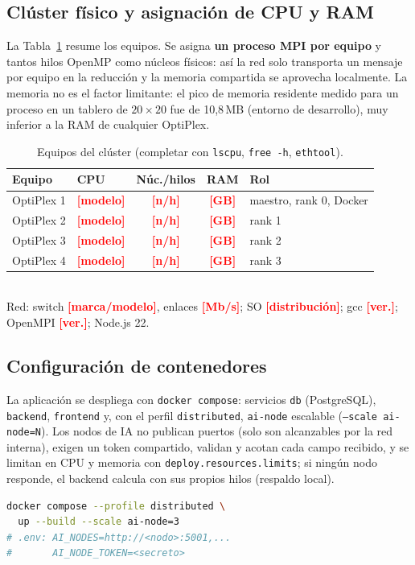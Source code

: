 \documentclass[conference]{IEEEtran}
\newcommand{\TODO}[1]{\textcolor{red}{\textbf{[#1]}}}
\begin{document}
\subsection{Cl\'uster f\'isico y asignaci\'on de CPU y RAM}
La Tabla~\ref{tab:hw} resume los equipos. Se asigna \textbf{un proceso MPI por equipo} y tantos hilos OpenMP como n\'ucleos f\'isicos: as\'i la red solo transporta un mensaje por equipo en la reducci\'on y la memoria compartida se aprovecha localmente. La memoria no es el factor limitante: el pico de memoria residente medido para un proceso en un tablero de $20\times20$ fue de 10,8\,MB (entorno de desarrollo), muy inferior a la RAM de cualquier OptiPlex.

\begin{table}[t]
\caption{Equipos del cl\'uster (completar con \texttt{lscpu}, \texttt{free -h}, \texttt{ethtool}).}\label{tab:hw}
\centering\scriptsize
\begin{tabular}{@{}llccl@{}}
\toprule
Equipo & CPU & N\'uc./hilos & RAM & Rol\\\midrule
OptiPlex 1 & \TODO{modelo} & \TODO{n/h} & \TODO{GB} & maestro, rank 0, Docker\\
OptiPlex 2 & \TODO{modelo} & \TODO{n/h} & \TODO{GB} & rank 1\\
OptiPlex 3 & \TODO{modelo} & \TODO{n/h} & \TODO{GB} & rank 2\\
OptiPlex 4 & \TODO{modelo} & \TODO{n/h} & \TODO{GB} & rank 3\\\bottomrule
\end{tabular}\\[2pt]
{\scriptsize Red: switch \TODO{marca/modelo}, enlaces \TODO{Mb/s}; SO \TODO{distribuci\'on}; gcc \TODO{ver.}; OpenMPI \TODO{ver.}; Node.js 22.}
\end{table}

\subsection{Configuraci\'on de contenedores}
La aplicaci\'on se despliega con \texttt{docker compose}: servicios \texttt{db} (PostgreSQL), \texttt{backend}, \texttt{frontend} y, con el perfil \texttt{distributed}, \texttt{ai-node} escalable (\texttt{--scale ai-node=N}). Los nodos de IA no publican puertos (solo son alcanzables por la red interna), exigen un token compartido, validan y acotan cada campo recibido, y se limitan en CPU y memoria con \texttt{deploy.resources.limits}; si ning\'un nodo responde, el backend calcula con sus propios hilos (respaldo local).
\begin{lstlisting}[language=bash]
docker compose --profile distributed \
  up --build --scale ai-node=3
# .env: AI_NODES=http://<nodo>:5001,...
#       AI_NODE_TOKEN=<secreto>
\end{lstlisting}
\end{document}
